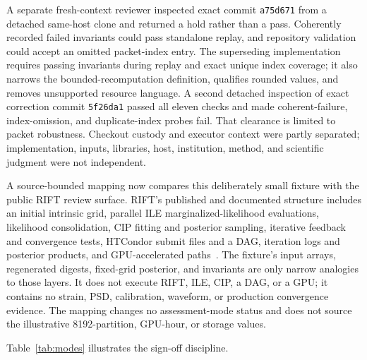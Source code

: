 \documentclass[11pt]{article}
\begin{document}
A separate fresh-context reviewer inspected exact commit \texttt{a75d671} from a detached same-host clone and returned a hold rather than a pass. Coherently recorded failed invariants could pass standalone replay, and repository validation could accept an omitted packet-index entry. The superseding implementation requires passing invariants during replay and exact unique index coverage; it also narrows the bounded-recomputation definition, qualifies rounded values, and removes unsupported resource language. A second detached inspection of exact correction commit \texttt{5f26da1} passed all eleven checks and made coherent-failure, index-omission, and duplicate-index probes fail. That clearance is limited to packet robustness. Checkout custody and executor context were partly separated; implementation, inputs, libraries, host, institution, method, and scientific judgment were not independent.

A source-bounded mapping now compares this deliberately small fixture with the public RIFT review surface. RIFT's published and documented structure includes an initial intrinsic grid, parallel ILE marginalized-likelihood evaluations, likelihood consolidation, CIP fitting and posterior sampling, iterative feedback and convergence tests, HTCondor submit files and a DAG, iteration logs and posterior products, and GPU-accelerated paths~\citep{lange-rift-2018,wysocki-rift-gpu-2019,rift-docs-overview-2026,rift-docs-pipeline-2026}. The fixture's input arrays, regenerated digests, fixed-grid posterior, and invariants are only narrow analogies to those layers. It does not execute RIFT, ILE, CIP, a DAG, or a GPU; it contains no strain, PSD, calibration, waveform, or production convergence evidence. The mapping changes no assessment-mode status and does not source the illustrative 8192-partition, GPU-hour, or storage values.

Table~\ref{tab:modes} illustrates the sign-off discipline.
\end{document}

